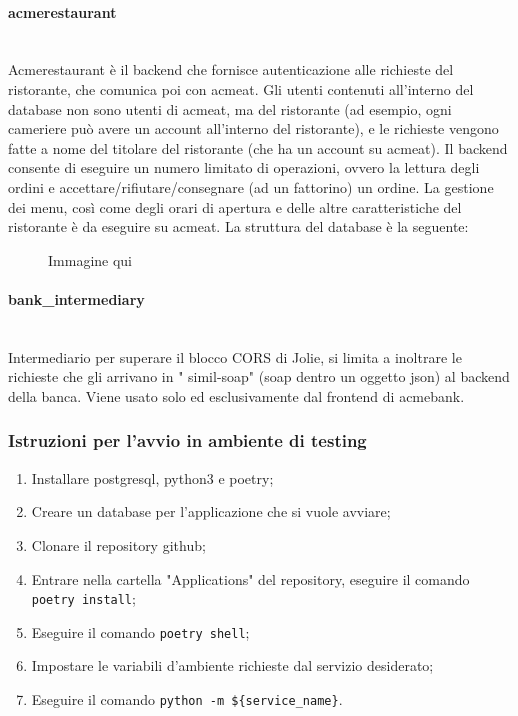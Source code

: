 \documentclass[11pt]{article} %
\begin{document}
\paragraph{acmerestaurant}\mbox{}\\
Acmerestaurant è il backend che fornisce autenticazione alle richieste del ristorante, che comunica poi con acmeat. Gli utenti contenuti all'interno del database non sono utenti di acmeat, ma del ristorante (ad esempio, ogni cameriere può avere un account all'interno del ristorante), e le richieste vengono fatte a nome del titolare del ristorante (che ha un account su acmeat). Il backend consente di eseguire un numero limitato di operazioni, ovvero la lettura degli ordini e accettare/rifiutare/consegnare (ad un fattorino) un ordine. La gestione dei menu, così come degli orari di apertura e delle altre caratteristiche del ristorante è da eseguire su acmeat. 
La struttura del database è la seguente:
\begin{figure}
Immagine qui
\end{figure}

\paragraph{bank\_intermediary}\mbox{}\\
Intermediario per superare il blocco CORS di Jolie, si limita a inoltrare le richieste che gli arrivano in " simil-soap" (soap dentro un oggetto json) al backend della banca. Viene usato solo ed esclusivamente dal frontend di acmebank.

\subsubsection{Istruzioni per l'avvio in ambiente di testing}

\begin{enumerate}
\item Installare postgresql, python3 e poetry;
\item Creare un database per l'applicazione che si vuole avviare;
\item Clonare il repository github;
\item Entrare nella cartella "Applications" del repository, eseguire il comando \verb|poetry install|;
\item Eseguire il comando \verb|poetry shell|;
\item Impostare le variabili d'ambiente richieste dal servizio desiderato;
\item Eseguire il comando \verb|python -m ${service_name}|.
\end{enumerate}
\end{document}
